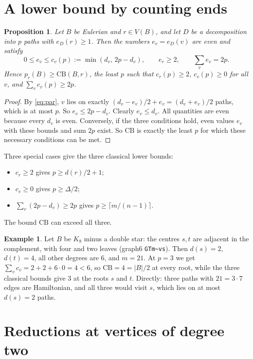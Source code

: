 \documentclass[11pt]{amsart}
\newtheorem{proposition}[theorem]{Proposition}
\theoremstyle{definition}
\newtheorem{example}[theorem]{Example}
\newcommand{\pr}{p_r}
\newcommand{\CB}{\mathrm{CB}}
\begin{document}
\section{A lower bound by counting ends}\label{sec:cb}

\begin{proposition}\label{prop:cb}
Let $B$ be Eulerian and $r\in V(B)$, and let $D$ be a decomposition into $p$ paths with $e_D(r)\ge1$.
Then the numbers $e_v=e_D(v)$ are even and satisfy
\[
0\le e_v\le c_v(p):=\min(d_v,\,2p-d_v),\qquad e_r\ge 2,\qquad \textstyle\sum_v e_v=2p .
\]
Hence $\pr(B)\ge\CB(B,r)$, the least $p$ such that $c_r(p)\ge2$, $c_v(p)\ge 0$ for all $v$, and
$\sum_v c_v(p)\ge 2p$.
\end{proposition}

\begin{proof}
By \eqref{eq:par}, $v$ lies on exactly $(d_v-e_v)/2+e_v=(d_v+e_v)/2$ paths, which is at most $p$. So
$e_v\le 2p-d_v$. Clearly $e_v\le d_v$. All quantities are even because every $d_v$ is even. Conversely,
if the three conditions hold, even values $e_v$ with these bounds and sum $2p$ exist. So $\CB$ is
exactly the least $p$ for which these necessary conditions can be met.
\end{proof}

Three special cases give the three classical lower bounds:
\begin{itemize}[leftmargin=*]
\item $c_r\ge2$ gives $p\ge d(r)/2+1$;
\item $c_v\ge0$ gives $p\ge\Delta/2$;
\item $\sum_v(2p-d_v)\ge2p$ gives $p\ge\lceil m/(n-1)\rceil$.
\end{itemize}
The bound $\CB$ can exceed all three.

\begin{example}\label{ex:ds}
Let $B$ be $K_8$ minus a double star: the centres $s,t$ are adjacent in the complement, with four and
two leaves (graph6 \texttt{GTm\~{}vs}). Then $d(s)=2$, $d(t)=4$, all other degrees are $6$, and $m=21$.
At $p=3$ we get $\sum_v c_v=2+2+6\cdot0=4<6$, so $\CB=4=|B|/2$ at every root, while the three classical
bounds give $3$ at the roots $s$ and $t$. Directly: three paths with $21=3\cdot 7$ edges are Hamiltonian,
and all three would visit $s$, which lies on at most $d(s)=2$ paths.
\end{example}

\section{Reductions at vertices of degree two}\label{sec:red}
\end{document}
